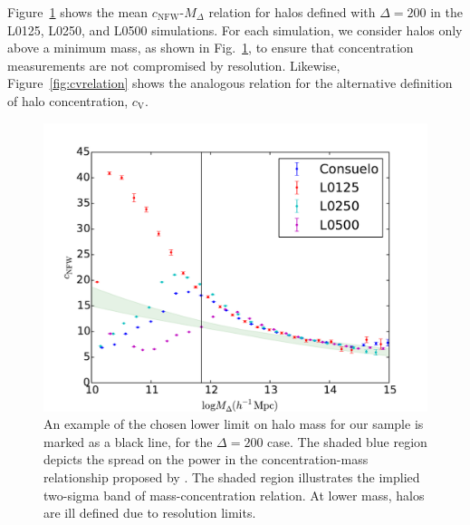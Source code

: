 \documentclass[usenatbib,usegraphicx,letterpaper]{mn2e}
\begin{document}
Figure~\ref{fig:cnfwrelation} shows the mean $c_{\mathrm{NFW}}$-$M_{\Delta}$ relation for halos defined with $\Delta=200$ 
in the L0125, L0250, and L0500 simulations. For each simulation, we consider halos only above a minimum mass, as shown in Fig.~\ref{fig:cnfwrelation}, to ensure that concentration measurements are not compromised by resolution. Likewise, Figure~\ref{fig:cvrelation} shows the analogous 
relation for the alternative definition of halo concentration, $c_{\mathrm{V}}$. 

\begin{figure}
\centering
\includegraphics[width=.5\textwidth]{masscut_cnfw_d200.pdf}
\caption{An example of the chosen lower limit on halo mass for our sample is marked as a black line, for the $\Delta = 200$ case. The shaded blue region depicts the spread on the power in the concentration-mass relationship proposed by \citet{duffy08}.  The shaded region illustrates the implied two-sigma band of \citet{duffy08} mass-concentration relation. At lower mass, halos are ill defined due to resolution limits.  }
\label{fig:cnfwrelation}
\end{figure}
\end{document}
